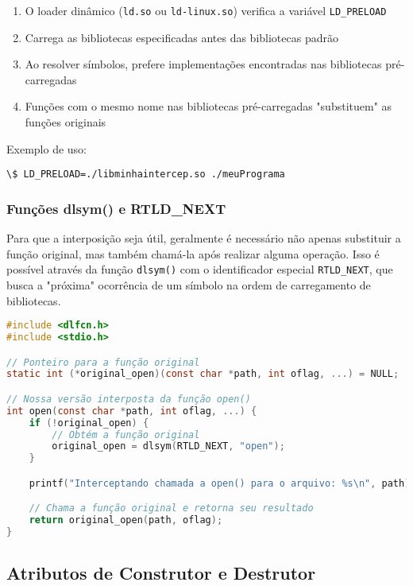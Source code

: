 \begin{enumerate}
    \item O loader dinâmico (\texttt{ld.so} ou \texttt{ld-linux.so}) verifica a variável \texttt{LD_PRELOAD}
    \item Carrega as bibliotecas especificadas antes das bibliotecas padrão
    \item Ao resolver símbolos, prefere implementações encontradas nas bibliotecas pré-carregadas
    \item Funções com o mesmo nome nas bibliotecas pré-carregadas "substituem" as funções originais
\end{enumerate}

Exemplo de uso:
\begin{verbatim}
\$ LD_PRELOAD=./libminhaintercep.so ./meuPrograma
\end{verbatim}

\subsubsection{Funções dlsym() e RTLD_NEXT}

Para que a interposição seja útil, geralmente é necessário não apenas substituir a função original, mas também chamá-la após realizar alguma operação. Isso é possível através da função \texttt{dlsym()} com o identificador especial \texttt{RTLD_NEXT}, que busca a "próxima" ocorrência de um símbolo na ordem de carregamento de bibliotecas.

\begin{lstlisting}[language=C, caption={Exemplo de interposição de função}]
#include <dlfcn.h>
#include <stdio.h>

// Ponteiro para a função original
static int (*original_open)(const char *path, int oflag, ...) = NULL;

// Nossa versão interposta da função open()
int open(const char *path, int oflag, ...) {
    if (!original_open) {
        // Obtém a função original
        original_open = dlsym(RTLD_NEXT, "open");
    }

    printf("Interceptando chamada a open() para o arquivo: %s\n", path);

    // Chama a função original e retorna seu resultado
    return original_open(path, oflag);
}
\end{lstlisting}

\subsection{Atributos de Construtor e Destrutor}

